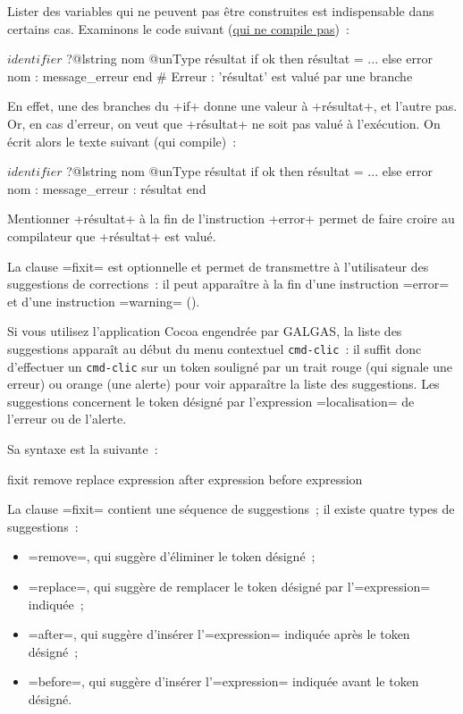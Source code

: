 
Lister des variables qui ne peuvent pas être construites est indispensable dans certains cas. Examinons le code suivant (\underline{qui ne compile pas})~:
\begin{galgas3}
$identifier$ ?@lstring nom
@unType résultat
if ok then
  résultat = ...
else
  error nom : message_erreur
end # Erreur : 'résultat' est valué par une branche
\end{galgas3}

En effet, une des branches du \ggst+if+ donne une valeur à \ggst+résultat+, et l'autre pas. Or, en cas d'erreur, on veut que \ggst+résultat+ ne soit pas valué à l'exécution. On écrit alors le texte suivant (qui compile)~:
\begin{galgas3}
$identifier$ ?@lstring nom
@unType résultat
if ok then
  résultat = ...
else
  error nom : message_erreur : résultat
end
\end{galgas3}

Mentionner \ggst+résultat+ à la fin de l'instruction \ggst+error+ permet de faire croire au compilateur que \ggst+résultat+ est valué.



La clause \ggst=fixit= est optionnelle et permet de transmettre à l'utilisateur des suggestions de corrections~: il peut apparaître à la fin d'une instruction \ggst=error= et d'une instruction \ggst=warning= ().

Si vous utilisez l'application Cocoa engendrée par GALGAS, la liste des suggestions apparaît au début du menu contextuel \texttt{cmd-clic}~: il suffit donc d'effectuer un \texttt{cmd-clic} sur un token souligné par un trait rouge (qui signale une erreur) ou orange (une alerte) pour voir apparaître la liste des suggestions. Les suggestions concernent le token désigné par l'expression \ggst=localisation= de l'erreur ou de l'alerte.

Sa syntaxe est la suivante~:

\begin{galgas3}
fixit {
  remove
  replace expression
  after expression
  before expression
}
\end{galgas3}

La clause \ggst=fixit= contient une séquence de suggestions~; il existe quatre types de suggestions~:
\begin{itemize}
\item \ggst=remove=, qui suggère d'éliminer le token désigné~;
\item \ggst=replace=, qui suggère de remplacer le token désigné par l'\ggst=expression= indiquée~;
\item \ggst=after=, qui suggère d'insérer l'\ggst=expression= indiquée après le token désigné~;
\item \ggst=before=, qui suggère d'insérer l'\ggst=expression= indiquée avant le token désigné.
\end{itemize}

